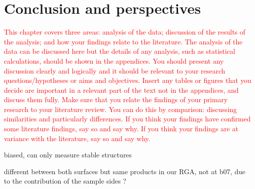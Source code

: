 \section{Conclusion and perspectives}

\textcolor{red}{This chapter covers three areas: analysis of the data; discussion of the results of the analysis; and how your findings relate to the literature. The analysis of the data can be discussed here but the details of any analysis, such as statistical calculations, should be shown in the appendices. You should present any discussion clearly and logically and it should be relevant to your research questions/hypotheses or aims and objectives. Insert any tables or figures that you decide are important in a relevant part of the text not in the appendices, and discuss them fully. Make sure that you relate the findings of your primary research to your literature review. You can do this by comparison: discussing similarities and particularly differences. If you think your findings have confirmed some literature findings, say so and say why. If you think your findings are at variance with the literature, say so and say why.}




biased, can only measure stable structures

different between both surfaces but same products in our RGA, not at b07, due to the contribution of the sample sides ?